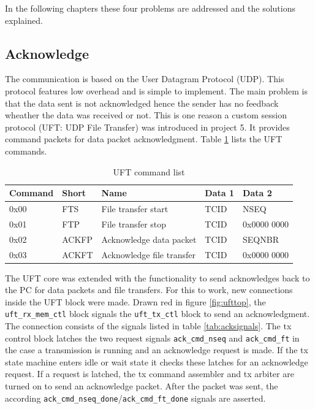 In the following chapters these four problems are addressed and the solutions
explained.

\subsection{Acknowledge}
The communication is based on the User Datagram Protocol (UDP). This protocol
features low overhead and is simple to implement. The main problem is that the
data sent is not acknowledged hence the sender has no feedback wheather the data
was received or not. This is one reason a custom session protocol (UFT: UDP
File Transfer) was introduced in project 5. It provides command packets for data
packet acknowledgment. Table \ref{tab:uftcommandlist} lists the UFT commands.


\begin{table}[t!]
    \centering
    \begin{tabular}{l l l l l}
        \toprule
        Command & Short & Name & Data 1 & Data 2 \\
        \midrule
        0x00 & FTS & 
        File transfer start & TCID & NSEQ
        \\
        0x01 & FTP &
        File transfer stop & TCID & 0x0000 0000
        \\
        0x02 & ACKFP &
        Acknowledge data packet & TCID & SEQNBR
        \\
        0x03 & ACKFT &
        Acknowledge file transfer & TCID & 0x0000 0000
        \\
        \bottomrule
    \end{tabular}
    \caption{UFT command list}
    \label{tab:uftcommandlist}
\end{table}

The UFT core was extended with the functionality to send acknowledges back to
the PC for data packets and file transfers. For this to work, new connections
inside the UFT block were made. Drawn red in figure \ref{fig:ufttop}, the 
\texttt{uft\_rx\_mem\_ctl} block signals the \texttt{uft\_tx\_ctl} block to send
an acknowledgment. The connection consists of the signals listed in table 
\ref{tab:acksignals}. The tx control block latches the two request signals 
\texttt{ack\_cmd\_nseq} and \texttt{ack\_cmd\_ft} in the case a transmission is
running and an acknowledge request is made. If the tx state machine enters idle
or wait state it checks these latches for an acknowledge request. If a request
is latched, the tx command assembler and tx arbiter are turned on to send an
acknowledge packet. After the packet was sent, the according 
\texttt{ack\_cmd\_nseq\_done}/\texttt{ack\_cmd\_ft\_done} signals are asserted.


